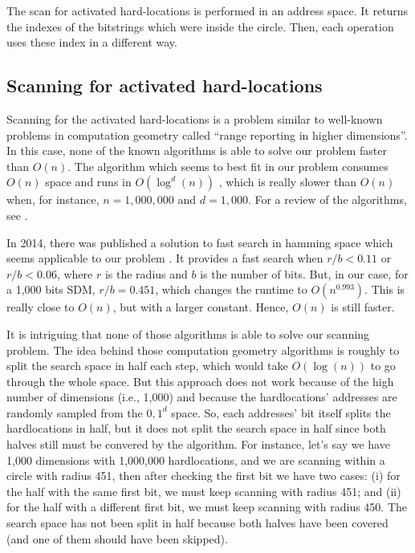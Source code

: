 The scan for activated hard-locations is performed in an address space. It returns the indexes of the bitstrings which were inside the circle. Then, each operation uses these index in a different way.

\subsection{Scanning for activated hard-locations}

Scanning for the activated hard-locations is a problem similar to well-known problems in computation geometry called ``range reporting in higher dimensions''. In this case, none of the known algorithms is able to solve our problem faster than $O(n)$. The algorithm which seems to best fit in our problem consumes $O(n)$ space and runs in $O(\log^d(n))$ \citep{chazelle1988functional}, which is really slower than $O(n)$ when, for instance, $n=1,000,000$ and $d=1,000$. For a review of the algorithms, see \citet{chan2011orthogonal}.

In 2014, there was published a solution to fast search in hamming space which seems applicable to our problem \citet{norouzi2014fast}. It provides a fast search when $r/b < 0.11$ or $r/b < 0.06$, where $r$ is the radius and $b$ is the number of bits. But, in our case, for a 1,000 bits SDM, $r/b = 0.451$, which changes the runtime to $O(n^{0.993})$. This is really close to $O(n)$, but with a larger constant. Hence, $O(n)$ is still faster.

It is intriguing that none of those algorithms is able to solve our scanning problem. The idea behind those computation geometry algorithms is roughly to split the search space in half each step, which would take $O(\log(n))$ to go through the whole space. But this approach does not work because of the high number of dimensions (i.e., 1,000) and because the hardlocations' addresses are randomly sampled from the ${0, 1}^d$ space. So, each addresses' bit itself splits the hardlocations in half, but it does not split the search space in half since both halves still must be convered by the algorithm. For instance, let's say we have 1,000 dimensions with 1,000,000 hardlocations, and we are scanning within a circle with radius 451, then after checking the first bit we have two cases: (i) for the half with the same first bit, we must keep scanning with radius 451; and (ii) for the half with a different first bit, we must keep scanning with radius 450. The search space has not been split in half because both halves have been covered (and one of them should have been skipped).

